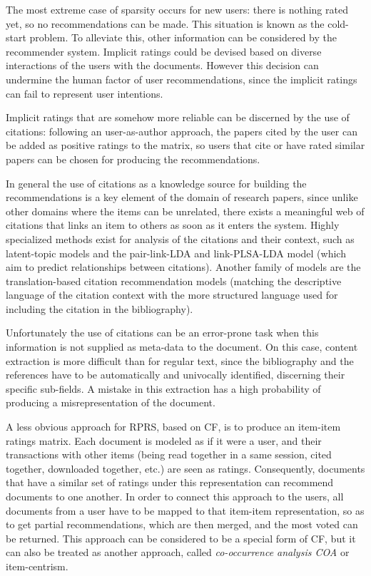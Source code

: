 \documentclass{llncs}
\begin{document}
The most extreme case of sparsity occurs for new users: there is nothing rated yet, so no recommendations can be made. This situation is known as the cold-start problem. To alleviate this, other information can be considered by the recommender system. Implicit ratings could be devised based on diverse interactions of the users with the documents\cite{pennock2000collaborative}\cite{yang2009cares}. However this decision can undermine the human factor of user recommendations, since the implicit ratings can fail to represent user intentions.

Implicit ratings that are somehow more reliable can be discerned by the use of citations: following an user-as-author approach, the papers cited by the user can be added as positive ratings to the matrix, so users that cite or have rated similar papers can be chosen for producing the recommendations\cite{caragea2013can}\cite{mcnee2002recommending}. 

In general the use of citations as a knowledge source for building the recommendations is a key element of the domain of research papers, since unlike other domains where the items can be unrelated, there exists a meaningful web of citations that links an item to others as soon as it enters the system. Highly specialized methods exist for analysis of the citations and their context, such as latent-topic models\cite{blei2003latent} and the pair-link-LDA and link-PLSA-LDA model\cite{blei2003latent}\cite{he2009detecting} (which aim to predict relationships between citations). Another family of models are the translation-based citation recommendation models (matching the descriptive language of the citation context with the more structured language used for including the citation in the bibliography)\cite{huang2012recommending}\cite{lu2011recommending}. 

Unfortunately the use of citations can be an error-prone task when this information is not supplied as meta-data to the document. On this case, content extraction is more difficult than for regular text, since the bibliography and the references have to be automatically and univocally identified, discerning their specific sub-fields\cite{councill2008parscit}. A mistake in this extraction has a high probability of producing a misrepresentation of the document. 

A less obvious approach for RPRS, based on CF, is to produce an item-item ratings matrix. Each document is modeled as if it were a user, and their transactions with other items (being read together in a same session\cite{bollen2006architecture}\cite{hwang2003prototype}\cite{monnich2008adding}, cited together\cite{mcnee2002recommending}, downloaded together\cite{pohl2007recommending}, etc.) are seen as ratings. Consequently, documents that have a similar set of ratings under this representation can recommend documents to one another. In order to connect this approach to the users, all documents from a user have to be mapped to that item-item representation, so as to get partial recommendations, which are then merged, and the most voted can be returned. This approach can be considered to be a special form of CF, but it can also be treated as another approach, called \textit{co-occurrence analysis COA} or item-centrism. 
\end{document}
